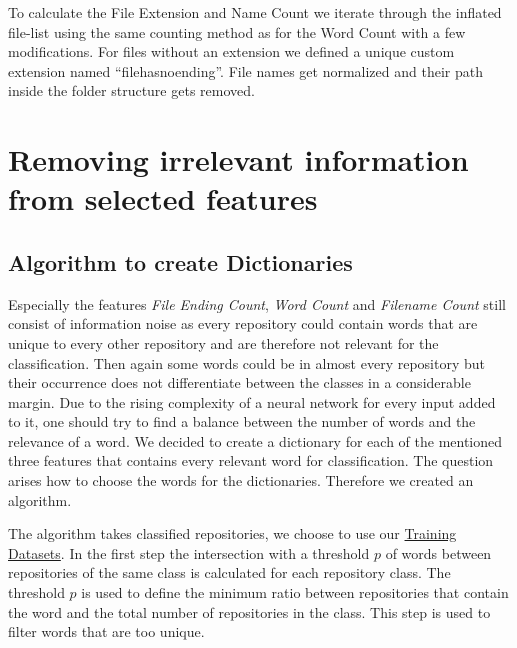 \documentclass[paper=A4,pagesize=auto,12pt,headinclude=true,footinclude=true,BCOR=0mm,DIV=calc]{scrartcl}
\begin{document}
	To calculate the File Extension and Name Count we iterate through the inflated file-list using the same counting method as for the Word Count with a few modifications. For files without an extension we defined a unique custom extension named “filehasnoending”.
	File names get normalized and their path inside the folder structure gets removed.
	
	
	\section{Removing irrelevant information from selected features}
	\label{sec: dictionary}
	\subsection{Algorithm to create Dictionaries}
	Especially the features \textit{File Ending Count}, \textit{Word Count} and\textit{ Filename Count} still consist of information noise as every repository could contain words that are unique to every other repository and are therefore not relevant for the classification. Then again some words could be in almost every repository but their occurrence does not differentiate between the classes in a considerable margin. Due to the rising complexity of a neural network for every input added to it, one should try to find a balance between the number of words and the relevance of a word. We decided to create a dictionary for each of the mentioned three features that contains every relevant word for classification.
	The question arises how to choose the words for the dictionaries. Therefore we created an algorithm.
	
	The algorithm takes classified repositories, we choose to use our \hyperref[src:Repositories]{Training Datasets}.
	In the first step the intersection with a threshold $p$ of words between repositories of the same class is calculated for each repository class. The threshold $p$ is used to define the minimum ratio between repositories that contain the word and the total number of repositories in the class. 
	This step is used to filter words that are too unique.
	
\end{document}
